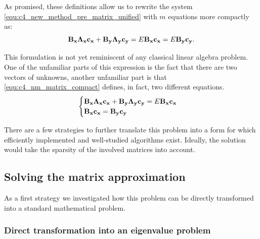 As promised, these definitions allow us to rewrite the system \eqref{equ:c4_new_method_pre_matrix_unified} with $m$ equations more compactly as:
\begin{equation}\label{equ:c4_nm_matrix_compact}
    \vb{B_x} \vb{\Lambda_x}\vb{c_x} + \vb{B_y} \vb{\Lambda_y}\vb{c_y} = E \vb{B_x} \vb{c_x} = E \vb{B_y} \vb{c_y}\text{.}
\end{equation}

This formulation is not yet reminiscent of any classical linear algebra problem. One of the unfamiliar parts of this expression is the fact that there are two vectors of unknowns, another unfamiliar part is that \eqref{equ:c4_nm_matrix_compact} defines, in fact, two different equations.
\begin{equation}
    \begin{cases}
        \vb{B_x} \vb{\Lambda_x}\vb{c_x} + \vb{B_y} \vb{\Lambda_y}\vb{c_y} = E \vb{B_x} \vb{c_x} \\
        \vb{B_x} \vb{c_x} = \vb{B_y} \vb{c_y}
    \end{cases} \label{equ:c4_new_method_first_matrix_problem}
\end{equation}

There are a few strategies to further translate this problem into a form for which efficiently implemented and well-studied algorithms exist. Ideally, the solution would take the sparsity of the involved matrices into account.

\subsection{Solving the matrix approximation}

As a first strategy we investigated how this problem can be directly transformed into a standard mathematical problem.

\subsubsection{Direct transformation into an eigenvalue problem}

